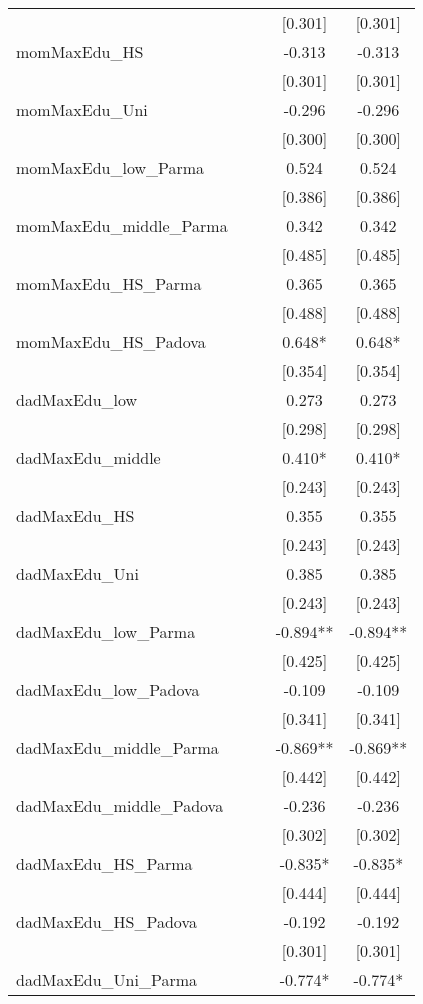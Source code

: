 \documentclass[]{article}
\begin{document}
\begin{tabular}{lcccc}
 &  &  & [0.301] & [0.301] \\
momMaxEdu\_HS &  &  & -0.313 & -0.313 \\
 &  &  & [0.301] & [0.301] \\
momMaxEdu\_Uni &  &  & -0.296 & -0.296 \\
 &  &  & [0.300] & [0.300] \\
momMaxEdu\_low\_Parma &  &  & 0.524 & 0.524 \\
 &  &  & [0.386] & [0.386] \\
momMaxEdu\_middle\_Parma &  &  & 0.342 & 0.342 \\
 &  &  & [0.485] & [0.485] \\
momMaxEdu\_HS\_Parma &  &  & 0.365 & 0.365 \\
 &  &  & [0.488] & [0.488] \\
momMaxEdu\_HS\_Padova &  &  & 0.648* & 0.648* \\
 &  &  & [0.354] & [0.354] \\
dadMaxEdu\_low &  &  & 0.273 & 0.273 \\
 &  &  & [0.298] & [0.298] \\
dadMaxEdu\_middle &  &  & 0.410* & 0.410* \\
 &  &  & [0.243] & [0.243] \\
dadMaxEdu\_HS &  &  & 0.355 & 0.355 \\
 &  &  & [0.243] & [0.243] \\
dadMaxEdu\_Uni &  &  & 0.385 & 0.385 \\
 &  &  & [0.243] & [0.243] \\
dadMaxEdu\_low\_Parma &  &  & -0.894** & -0.894** \\
 &  &  & [0.425] & [0.425] \\
dadMaxEdu\_low\_Padova &  &  & -0.109 & -0.109 \\
 &  &  & [0.341] & [0.341] \\
dadMaxEdu\_middle\_Parma &  &  & -0.869** & -0.869** \\
 &  &  & [0.442] & [0.442] \\
dadMaxEdu\_middle\_Padova &  &  & -0.236 & -0.236 \\
 &  &  & [0.302] & [0.302] \\
dadMaxEdu\_HS\_Parma &  &  & -0.835* & -0.835* \\
 &  &  & [0.444] & [0.444] \\
dadMaxEdu\_HS\_Padova &  &  & -0.192 & -0.192 \\
 &  &  & [0.301] & [0.301] \\
dadMaxEdu\_Uni\_Parma &  &  & -0.774* & -0.774* \\

\end{tabular}
\end{document}
